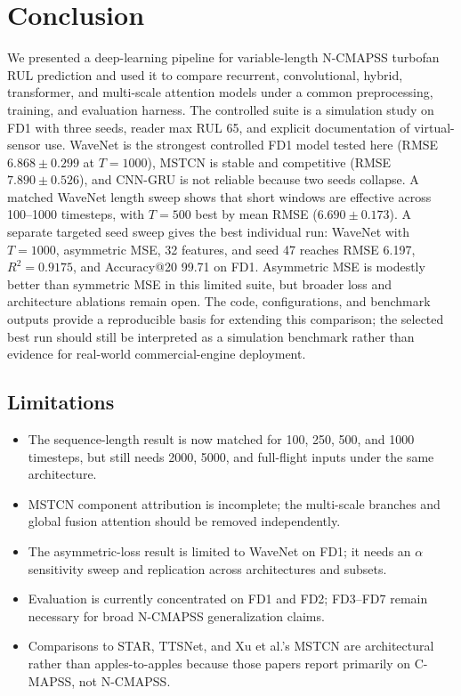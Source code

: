 \section{Conclusion}

We presented a deep-learning pipeline for variable-length N-CMAPSS turbofan RUL prediction and used it to compare recurrent, convolutional, hybrid, transformer, and multi-scale attention models under a common preprocessing, training, and evaluation harness. The controlled suite is a simulation study on FD1 with three seeds, reader max RUL 65, and explicit documentation of virtual-sensor use. WaveNet is the strongest controlled FD1 model tested here (RMSE $6.868\pm0.299$ at $T{=}1000$), MSTCN is stable and competitive (RMSE $7.890\pm0.526$), and CNN-GRU is not reliable because two seeds collapse. A matched WaveNet length sweep shows that short windows are effective across 100--1000 timesteps, with $T{=}500$ best by mean RMSE ($6.690\pm0.173$). A separate targeted seed sweep gives the best individual run: WaveNet with $T{=}1000$, asymmetric MSE, 32 features, and seed 47 reaches RMSE 6.197, $R^2=0.9175$, and Accuracy@20 99.71 on FD1. Asymmetric MSE is modestly better than symmetric MSE in this limited suite, but broader loss and architecture ablations remain open. The code, configurations, and benchmark outputs provide a reproducible basis for extending this comparison; the selected best run should still be interpreted as a simulation benchmark rather than evidence for real-world commercial-engine deployment.

\subsection*{Limitations}

\begin{itemize}
  \item The sequence-length result is now matched for 100, 250, 500, and 1000 timesteps, but still needs 2000, 5000, and full-flight inputs under the same architecture.
  \item MSTCN component attribution is incomplete; the multi-scale branches and global fusion attention should be removed independently.
  \item The asymmetric-loss result is limited to WaveNet on FD1; it needs an $\alpha$ sensitivity sweep and replication across architectures and subsets.
  \item Evaluation is currently concentrated on FD1 and FD2; FD3--FD7 remain necessary for broad N-CMAPSS generalization claims.
  \item Comparisons to STAR, TTSNet, and Xu et al.'s MSTCN are architectural rather than apples-to-apples because those papers report primarily on C-MAPSS, not N-CMAPSS.
\end{itemize}
